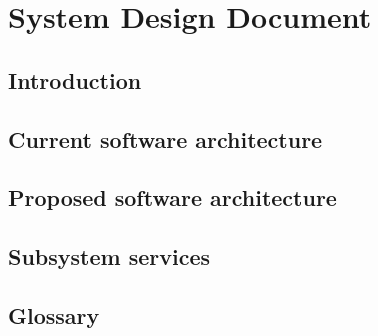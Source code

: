 


	\part*{System Design Document}

	
	\newpage
	
	\setcounter{secnumdepth}{2} %
	\tableofcontents* %
	\newpage

	\chapter{Introduction}
	
	\newpage

	\chapter{Current software architecture}
	

	\chapter{Proposed software architecture}
	

	\chapter{Subsystem services}
	

	\chapter{Glossary}
	

